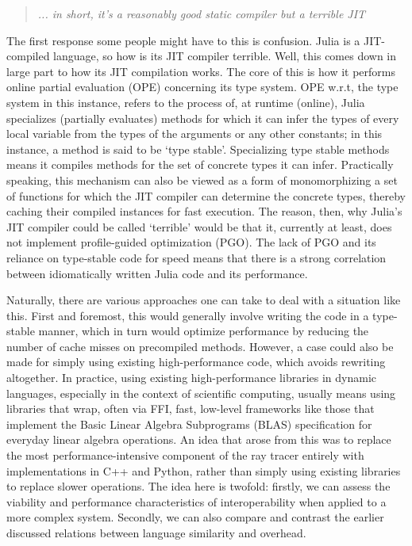 \begin{quote}
  \textit{... in short, it's a reasonably good static compiler but a terrible JIT}
\end{quote}

The first response some people might have to this is confusion. Julia is a JIT-compiled language, so how is its JIT compiler terrible. Well, this comes down in large part to how its JIT compilation works. The core of this is how it performs online partial evaluation (OPE) concerning its type system. OPE w.r.t, the type system in this instance, refers to the process of, at runtime (online), Julia specializes (partially evaluates) methods for which it can infer the types of every local variable from the types of the arguments or any other constants; in this instance, a method is said to be `type stable'. Specializing type stable methods means it compiles methods for the set of concrete types it can infer. Practically speaking, this mechanism can also be viewed as a form of monomorphizing a set of functions for which the JIT compiler can determine the concrete types, thereby caching their compiled instances for fast execution. The reason, then, why Julia's JIT compiler could be called `terrible' would be that it, currently at least, does not implement profile-guided optimization (PGO). The lack of PGO and its reliance on type-stable code for speed means that there is a strong correlation between idiomatically written Julia code and its performance. 

Naturally, there are various approaches one can take to deal with a situation like this. First and foremost, this would generally involve writing the code in a type-stable manner, which in turn would optimize performance by reducing the number of cache misses on precompiled methods. However, a case could also be made for simply using existing high-performance code, which avoids rewriting altogether. In practice, using existing high-performance libraries in dynamic languages, especially in the context of scientific computing, usually means using libraries that wrap, often via FFI, fast, low-level frameworks like those that implement the Basic Linear Algebra Subprograms (BLAS) specification for everyday linear algebra operations. An idea that arose from this was to replace the most performance-intensive component of the ray tracer entirely with implementations in C++ and Python, rather than simply using existing libraries to replace slower operations. The idea here is twofold: firstly, we can assess the viability and performance characteristics of interoperability when applied to a more complex system. Secondly, we can also compare and contrast the earlier discussed relations between language similarity and overhead.    

